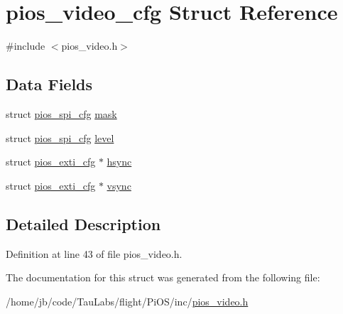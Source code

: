\hypertarget{structpios__video__cfg}{\section{pios\-\_\-video\-\_\-cfg \-Struct \-Reference}
\label{structpios__video__cfg}
}


{\ttfamily \#include $<$pios\-\_\-video.\-h$>$}

\subsection*{\-Data \-Fields}
\begin{DoxyCompactItemize}
\item 
struct \hyperlink{structpios__spi__cfg}{pios\-\_\-spi\-\_\-cfg} \hyperlink{group___p_i_o_s___v_i_d_e_o_gac6699e31fbc588e69db444000ba7d44d}{mask}
\item 
struct \hyperlink{structpios__spi__cfg}{pios\-\_\-spi\-\_\-cfg} \hyperlink{group___p_i_o_s___v_i_d_e_o_gab3de6ddfa1d478f8062c895cad5d4793}{level}
\item 
struct \hyperlink{structpios__exti__cfg}{pios\-\_\-exti\-\_\-cfg} $\ast$ \hyperlink{group___p_i_o_s___v_i_d_e_o_ga01589e94ad18d5c8d12f72778539f8aa}{hsync}
\item 
struct \hyperlink{structpios__exti__cfg}{pios\-\_\-exti\-\_\-cfg} $\ast$ \hyperlink{group___p_i_o_s___v_i_d_e_o_ga489c20025b1facf5435c66ff616e1cd9}{vsync}
\end{DoxyCompactItemize}


\subsection{\-Detailed \-Description}


\-Definition at line 43 of file pios\-\_\-video.\-h.



\-The documentation for this struct was generated from the following file\-:\begin{DoxyCompactItemize}
\item 
/home/jb/code/\-Tau\-Labs/flight/\-Pi\-O\-S/inc/\hyperlink{pios__video_8h}{pios\-\_\-video.\-h}\end{DoxyCompactItemize}
